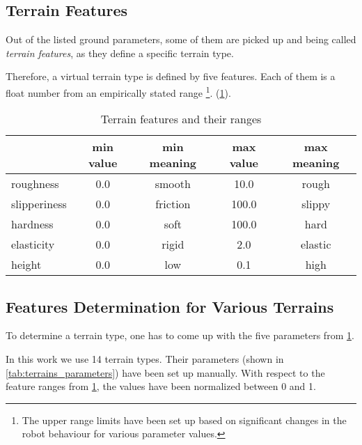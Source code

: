 \subsection{Terrain Features} \label{ssec:terrain_features}
Out of the listed ground parameters, some of them are picked up and being called \textit{terrain features}, as they define a specific terrain type.

Therefore, a virtual terrain type is defined by five features. Each of them is a float number from an empirically stated range \footnote{The upper range limits have been set up based on significant changes in the robot behaviour for various parameter values.}. (\cref{tab:terrain_features}).

\begin{table}[H]
\centering
\caption{Terrain features and their ranges}
\label{tab:terrain_features}
\begin{tabular}{|l|c|c|c|c|} \hline
             & min value & min meaning & max value & max meaning \\\hline
roughness    & 0.0       & smooth		& 10.0		& rough     \\\hline
slipperiness & 0.0       & friction		& 100.0		& slippy    \\\hline
hardness     & 0.0       & soft			& 100.0		& hard	    \\\hline
elasticity   & 0.0       & rigid		& 2.0		& elastic   \\\hline
height       & 0.0       & low			& 0.1		& high		 \\\hline
\end{tabular}
\end{table}

\subsection{Features Determination for Various Terrains} \label{ssec:features_determination}
To determine a terrain type, one has to come up with the five parameters from \cref{tab:terrain_features}.

In this work we use 14 terrain types. Their parameters (shown in \cref{tab:terrains_parameters}) have been set up manually. With respect to the feature ranges from \cref{tab:terrain_features}, the values have been normalized between 0 and 1.

